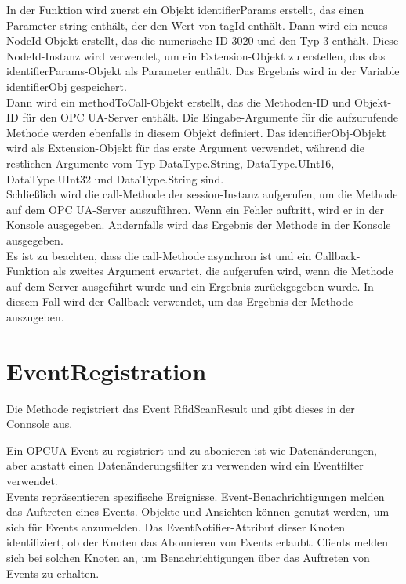 In der Funktion wird zuerst ein Objekt identifierParams erstellt, das einen Parameter string enthält, der den Wert von tagId enthält. Dann wird ein neues NodeId-Objekt erstellt, das die numerische ID 3020 und den Typ 3 enthält. Diese NodeId-Instanz wird verwendet, um ein Extension-Objekt zu erstellen, das das identifierParams-Objekt als Parameter enthält. Das Ergebnis wird in der Variable identifierObj gespeichert.\\

Dann wird ein methodToCall-Objekt erstellt, das die Methoden-ID und Objekt-ID für den OPC UA-Server enthält. Die Eingabe-Argumente für die aufzurufende Methode werden ebenfalls in diesem Objekt definiert. Das identifierObj-Objekt wird als Extension-Objekt für das erste Argument verwendet, während die restlichen Argumente vom Typ DataType.String, DataType.UInt16, DataType.UInt32 und DataType.String sind.\\

Schließlich wird die call-Methode der session-Instanz aufgerufen, um die Methode auf dem OPC UA-Server auszuführen. Wenn ein Fehler auftritt, wird er in der Konsole ausgegeben. Andernfalls wird das Ergebnis der Methode in der Konsole ausgegeben.\\

Es ist zu beachten, dass die call-Methode asynchron ist und ein Callback-Funktion als zweites Argument erwartet, die aufgerufen wird, wenn die Methode auf dem Server ausgeführt wurde und ein Ergebnis zurückgegeben wurde. In diesem Fall wird der Callback verwendet, um das Ergebnis der Methode auszugeben.\\



\section{EventRegistration}

Die Methode registriert das Event RfidScanResult und gibt dieses in der Connsole aus.

Ein OPCUA Event zu registriert und zu abonieren ist wie Datenänderungen, aber anstatt einen Datenänderungsfilter zu verwenden wird ein Eventfilter verwendet.\\


Events repräsentieren spezifische Ereignisse. Event-Benachrichtigungen melden das Auftreten eines Events. Objekte und Ansichten können genutzt werden, um sich für Events anzumelden. Das EventNotifier-Attribut dieser Knoten identifiziert, ob der Knoten das Abonnieren von Events erlaubt. Clients melden sich bei solchen Knoten an, um Benachrichtigungen über das Auftreten von Events zu erhalten.\\

